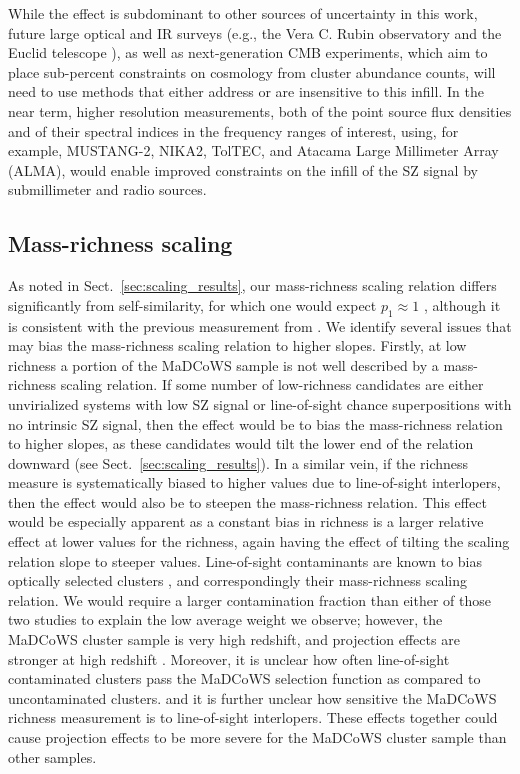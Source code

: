 \documentclass[longauth]{aa} %
\newcommand{\madcows}{MaDCoWS\xspace}
\begin{document}
While the effect is subdominant to other sources of uncertainty in this work, future large optical and IR surveys (e.g., the Vera C. Rubin observatory \citep{Ivezi2019} and the Euclid telescope \citep{Euclid2020}), as well as next-generation CMB experiments, which aim to place sub-percent constraints on cosmology from cluster abundance counts, will need to use methods that either address or are insensitive to this infill. 
In the near term, higher resolution measurements, both of the point source flux densities and of their spectral indices in the frequency ranges of interest, using, for example, MUSTANG-2, NIKA2, TolTEC, and Atacama Large Millimeter Array (ALMA), would enable improved constraints on the infill of the SZ signal by submillimeter and radio sources.

\subsection{Mass-richness scaling}\label{sec:scaling_disc}

As noted in Sect.~\ref{sec:scaling_results}, our mass-richness scaling relation differs significantly from self-similarity, for which one would expect $p_1 \approx 1$ \citep{Capasso2019, McClintock2019, Bleem2020, Grandis2021}, although it is consistent with the previous measurement from \cite{Gonzalez2019}.  We identify several issues that may bias the mass-richness scaling relation to higher slopes. Firstly, at low richness a portion of the MaDCoWS sample is not well described by a mass-richness scaling relation. If some number of low-richness candidates are either unvirialized systems with low SZ signal or line-of-sight chance superpositions with no intrinsic SZ signal, then the effect would be to bias the mass-richness relation to higher slopes, as these candidates would tilt the lower end of the relation downward (see Sect.~\ref{sec:scaling_results}). In a similar vein, if the richness measure is systematically biased to higher values due to line-of-sight interlopers, then the effect would also be to steepen the mass-richness relation. This effect would be especially apparent as a constant bias in richness is a larger relative effect at lower values for the richness, again having the effect of tilting the scaling relation slope to steeper values. Line-of-sight contaminants are known to bias optically selected clusters \citep{Costanzi2019, Grandis2021}, and correspondingly their mass-richness scaling relation. We would require a larger contamination fraction than either of those two studies to explain the low average weight we observe; however, the \madcows cluster sample is very high redshift, and projection effects are stronger at high redshift \citep{Yee2002, Costanzi2019}. Moreover, it is unclear how often line-of-sight contaminated clusters pass the \madcows selection function as compared to uncontaminated clusters. and it is further unclear how sensitive the \madcows richness measurement is to line-of-sight interlopers. These effects together could cause projection effects to be more severe for the \madcows cluster sample than other samples.
\end{document}
